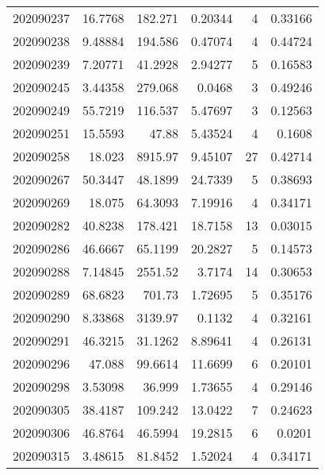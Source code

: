 \begin{tabular}{rrrrrr}
 202090237 &         16.7768  &      182.271  &            0.20344 &           4 & 0.33166 \\
 202090238 &          9.48884 &      194.586  &            0.47074 &           4 & 0.44724 \\
 202090239 &          7.20771 &       41.2928 &            2.94277 &           5 & 0.16583 \\
 202090245 &          3.44358 &      279.068  &            0.0468  &           3 & 0.49246 \\
 202090249 &         55.7219  &      116.537  &            5.47697 &           3 & 0.12563 \\
 202090251 &         15.5593  &       47.88   &            5.43524 &           4 & 0.1608  \\
 202090258 &         18.023   &     8915.97   &            9.45107 &          27 & 0.42714 \\
 202090267 &         50.3447  &       48.1899 &           24.7339  &           5 & 0.38693 \\
 202090269 &         18.075   &       64.3093 &            7.19916 &           4 & 0.34171 \\
 202090282 &         40.8238  &      178.421  &           18.7158  &          13 & 0.03015 \\
 202090286 &         46.6667  &       65.1199 &           20.2827  &           5 & 0.14573 \\
 202090288 &          7.14845 &     2551.52   &            3.7174  &          14 & 0.30653 \\
 202090289 &         68.6823  &      701.73   &            1.72695 &           5 & 0.35176 \\
 202090290 &          8.33868 &     3139.97   &            0.1132  &           4 & 0.32161 \\
 202090291 &         46.3215  &       31.1262 &            8.89641 &           4 & 0.26131 \\
 202090296 &         47.088   &       99.6614 &           11.6699  &           6 & 0.20101 \\
 202090298 &          3.53098 &       36.999  &            1.73655 &           4 & 0.29146 \\
 202090305 &         38.4187  &      109.242  &           13.0422  &           7 & 0.24623 \\
 202090306 &         46.8764  &       46.5994 &           19.2815  &           6 & 0.0201  \\
 202090315 &          3.48615 &       81.8452 &            1.52024 &           4 & 0.34171 \\

\end{tabular}
